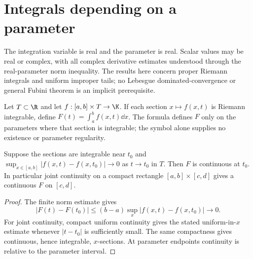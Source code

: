 \chapter{Integrals depending on a parameter}
The integration variable is real and the parameter is real. Scalar values may
be real or complex, with all complex derivative estimates understood through
the real-parameter norm inequality. The results here concern proper Riemann
integrals and uniform improper tails; no Lebesgue dominated-convergence or
general Fubini theorem is an implicit prerequisite.

\begin{definition}
Let $T\subset\R$ and let $f:[a,b]\times T\to\K$. If each section
$x\mapsto f(x,t)$ is Riemann integrable, define
$F(t)=\int_a^bf(x,t)\dd x$. The formula defines $F$ only on the
parameters where that section is integrable; the symbol alone supplies
no existence or parameter regularity.
\end{definition}

\begin{theorem}
Suppose the sections are integrable near $t_0$ and
$\sup_{x\in[a,b]}|f(x,t)-f(x,t_0)|\to0$ as $t\to t_0$ in $T$.
Then $F$ is continuous at $t_0$. In particular joint continuity on a
compact rectangle $[a,b]\times[c,d]$ gives a continuous $F$ on $[c,d]$.
\end{theorem}
\begin{proof}
The finite norm estimate gives
\[|F(t)-F(t_0)|\le(b-a)\sup_x|f(x,t)-f(x,t_0)|\longrightarrow0.
\]
For joint continuity, compact uniform continuity gives the stated
uniform-in-$x$ estimate whenever $|t-t_0|$ is sufficiently small.
The same compactness gives continuous, hence integrable, $x$-sections.
At parameter endpoints continuity is relative to the parameter interval.
\end{proof}

